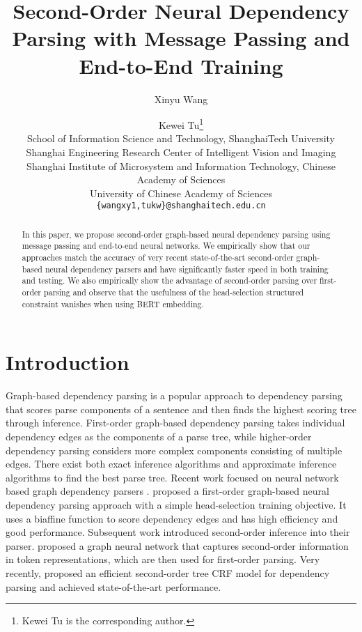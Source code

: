 \documentclass[11pt,a4paper]{article}
\title{Second-Order Neural Dependency Parsing with Message Passing and End-to-End Training}
\author{Xinyu Wang \and Kewei Tu\thanks{\hspace{1mm} Kewei Tu is the corresponding author. } \\
 School of Information Science and Technology, ShanghaiTech University \\
 Shanghai Engineering Research Center of Intelligent Vision and Imaging \\
 Shanghai Institute of Microsystem and Information Technology, Chinese Academy of Sciences \\
 University of Chinese Academy of Sciences \\
  {\tt \{wangxy1,tukw\}@shanghaitech.edu.cn} \\
 }
\date{}
\begin{document}
\maketitle
\begin{abstract}
In this paper, we propose second-order graph-based neural dependency parsing using message passing and end-to-end neural networks. We empirically show that our approaches match the accuracy of very recent state-of-the-art second-order graph-based neural dependency parsers and have significantly faster speed in both training and testing. We also empirically show the advantage of second-order parsing over first-order parsing and observe that the usefulness of the head-selection structured constraint vanishes when using BERT embedding.
\end{abstract}

\section{Introduction}
Graph-based dependency parsing is a popular approach to dependency parsing that scores parse components of a sentence and then finds the highest scoring tree through inference. First-order graph-based dependency parsing takes individual dependency edges as the components of a parse tree, while higher-order dependency parsing considers more complex components consisting of multiple edges. There exist both exact inference algorithms \cite{carreras2007experiments,koo-collins-2010-efficient,ma-zhao-2012-fourth} and approximate inference algorithms \cite{mcdonald2006online,smith-eisner-2008-dependency,gormley-etal-2015-approximation} to find the best parse tree.
Recent work focused on neural network based graph dependency parsers \cite{kiperwasser-goldberg-2016-simple,wang-chang-2016-graph,cheng-etal-2016-bi,kuncoro-etal-2016-distilling,ma-hovy-2017-neural,dozat2016deep}. \citet{dozat2016deep} proposed a first-order graph-based neural dependency parsing approach with a simple head-selection training objective. It uses a biaffine function to score dependency edges and has high efficiency and good performance. Subsequent work introduced second-order inference into their parser. \citet{ji-etal-2019-graph} proposed a graph neural network that captures second-order information in token representations, which are then used for first-order parsing. Very recently, \citet{zhang2020efficient} proposed an efficient second-order tree CRF model for dependency parsing and achieved state-of-the-art performance.
\end{document}
